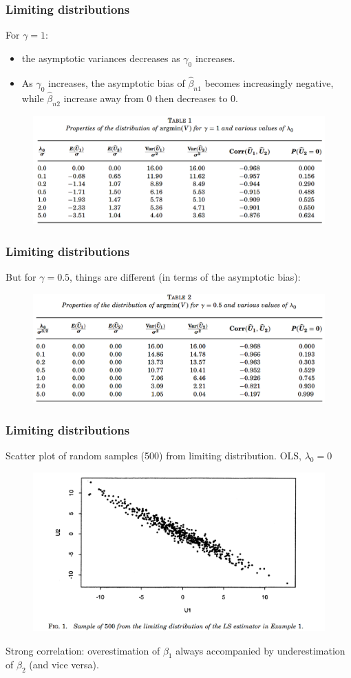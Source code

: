 \documentclass{beamer}
\begin{document}
	\begin{frame}
		\frametitle{Limiting distributions}
		For $\gamma = 1$:
		\begin{itemize}
			\item 
			the asymptotic variances decreases as $\gamma_0$ increases.
			\item
			As $\gamma_0$ increases, the asymptotic bias of $\hat{\beta}_{n1}$ becomes increasingly negative, while $\hat{\beta}_{n2}$ increase away from 0 then decreases to 0.
		\end{itemize}
		\begin{figure}
			\includegraphics[width=1\linewidth]{image006.png}
		\end{figure}
	\end{frame}
	
	\begin{frame}
		\frametitle{Limiting distributions}
		But for $\gamma = 0.5$, things are different (in terms of the asymptotic bias):
		\begin{figure}
			\includegraphics[width=1\linewidth]{image007.png}
		\end{figure}
	\end{frame}
	
	\begin{frame}
		\frametitle{Limiting distributions}
		Scatter plot of random samples (500) from limiting distribution. OLS, $\lambda_0 = 0$
		\begin{figure}
			\includegraphics[width=.8\linewidth]{image008.png}
		\end{figure}
		Strong correlation: overestimation of $\beta_1$ always accompanied by underestimation of $\beta_2$ (and vice versa).
	\end{frame}
	
\end{document}
